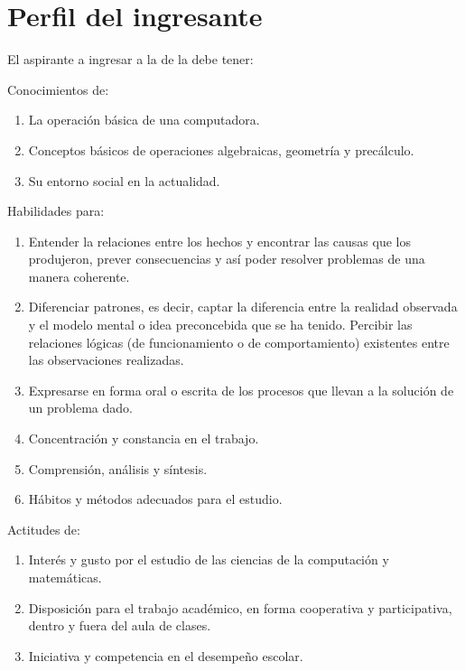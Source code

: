 \section{Perfil del ingresante}

El aspirante a ingresar a la \SchoolFullName de la \University debe tener:

\noindent Conocimientos de:
\begin{enumerate}
\item La operación básica de una computadora.
\item Conceptos básicos de operaciones algebraicas, geometría y precálculo.
\item Su entorno social en la actualidad.
\end{enumerate}

\noindent Habilidades para:
\begin{enumerate}
\item Entender la relaciones entre los hechos y encontrar las causas que los produjeron, prever consecuencias y así poder resolver problemas de una manera coherente.  
\item Diferenciar patrones, es decir, captar la diferencia entre la realidad observada y el modelo mental o idea preconcebida que se ha tenido. 
Percibir las relaciones lógicas (de funcionamiento o de comportamiento) existentes entre las observaciones realizadas.
\item Expresarse en forma oral o escrita de los procesos que llevan a la solución de un problema dado.
\item Concentración y constancia en el trabajo.
\item Comprensión, análisis y síntesis.
\item Hábitos y métodos adecuados para el estudio.
\end{enumerate}

\noindent Actitudes de:
\begin{enumerate}
\item Interés y gusto por el estudio de las ciencias de la computación y matemáticas.
\item Disposición para el trabajo académico, en forma cooperativa y participativa, dentro y fuera del aula de clases.
\item Iniciativa y competencia en el desempeño escolar.
\end{enumerate}